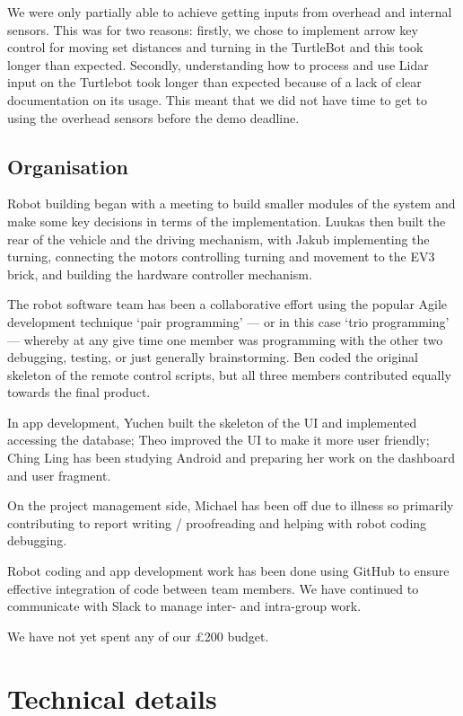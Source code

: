 \documentclass{article}
\begin{document}
We were only partially able to achieve getting inputs from overhead and internal sensors. This was for two reasons: firstly, we chose to implement arrow key control for moving set distances and turning in the TurtleBot and this took longer than expected. Secondly, understanding how to process and use Lidar input on the Turtlebot took longer than expected because of a lack of clear documentation on its usage. This meant that we did not have time to get to using the overhead sensors before the demo deadline.

\subsection{Organisation}

Robot building began with a meeting to build smaller modules of the system and make some key decisions in terms of the implementation. Luukas then built the rear of the vehicle and the driving mechanism, with Jakub implementing the turning, connecting the motors controlling turning and movement to the EV3 brick, and building the hardware controller mechanism.

The robot software team has been a collaborative effort using the popular Agile development technique `pair programming' --- or in this case `trio programming' --- whereby at any give time one member was programming with the other two debugging, testing, or just generally brainstorming. Ben coded the original skeleton of the remote control scripts, but all three members contributed equally towards the final product.

In app development, Yuchen built the skeleton of the UI and implemented accessing the database; Theo improved the UI to make it more user friendly; Ching Ling has been studying Android and preparing her work on the dashboard and user fragment.

On the project management side, Michael has been off due to illness so primarily contributing to report writing / proofreading and helping with robot coding debugging. 

Robot coding and app development work has been done using GitHub to ensure effective integration of code between team members. We have continued to communicate with Slack to manage inter- and intra-group work.

We have not yet spent any of our \pounds 200 budget.

\section{Technical details}
\end{document}
